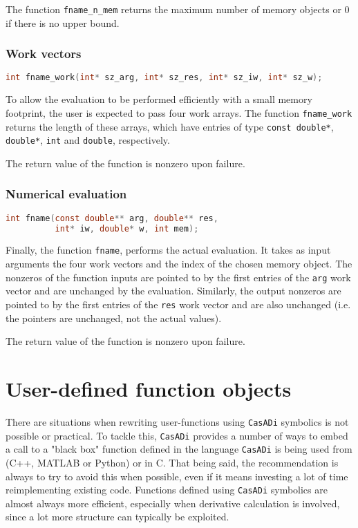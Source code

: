 \documentclass[a4paper,12pt]{book}
\newcommand{\CasADi}{\texttt{CasADi}\xspace}
\begin{document}
The function \verb|fname_n_mem| returns the maximum number of memory objects
or 0 if there is no upper bound.

\subsection*{Work vectors}
\begin{lstlisting}[language=C]
int fname_work(int* sz_arg, int* sz_res, int* sz_iw, int* sz_w);
\end{lstlisting}

To allow the evaluation to be performed efficiently with a small memory
footprint, the user is expected to pass four work arrays. The function
\verb|fname_work| returns the length of these arrays, which have entries
of type \verb|const double*|, \verb|double*|, \verb|int| and \verb|double|,
respectively.

The return value of the function is nonzero upon failure.

\subsection*{Numerical evaluation}
\begin{lstlisting}[language=C]
int fname(const double** arg, double** res,
          int* iw, double* w, int mem);
\end{lstlisting}

Finally, the function \verb|fname|, performs the actual evaluation. It takes
as input arguments the four work vectors and the index of the chosen memory
object. The nonzeros of the function inputs are pointed to by the
first entries of the \texttt{arg} work vector and are unchanged by the evaluation.
Similarly, the output nonzeros are pointed to by the first entries of the
\texttt{res} work vector and are also unchanged (i.e. the pointers are unchanged,
not the actual values).

The return value of the function is nonzero upon failure.

\chapter{User-defined function objects} \label{ch:user-defined}
There are situations when rewriting user-functions using \CasADi symbolics is not
possible or practical. To tackle this, \CasADi provides a number of ways to
embed a call to a "black box" function defined in the language \CasADi is being
used from (C++, MATLAB or Python) or in C.
That being said, the recommendation is always to try to avoid this when possible,
even if it means investing a lot of time reimplementing existing code.
Functions defined using \CasADi symbolics are almost always more
efficient, especially when derivative calculation is involved, since a lot more
structure can typically be exploited.
\end{document}
